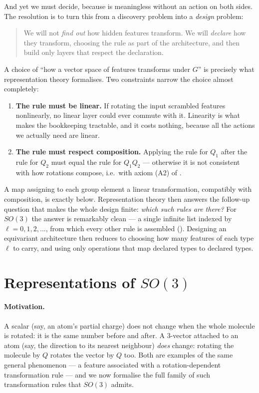 \documentclass[11pt,a4paper]{report}
\theoremstyle{definition}
\theoremstyle{remark}
\begin{document}
And yet we must decide, because  is
meaningless without an action on both sides. The resolution is to turn this
from a discovery problem into a \emph{design} problem:

\begin{quote}
We will not \emph{find out} how hidden features transform. We will
\emph{declare} how they transform, choosing the rule as part of the
architecture, and then build only layers that respect the declaration.
\end{quote}

A choice of ``how a vector space of features transforms under $G$'' is
precisely what representation theory formalises. Two constraints narrow the
choice almost completely:

\begin{enumerate}
\item \textbf{The rule must be linear.} If rotating the input scrambled
features nonlinearly, no linear layer could ever commute with it. Linearity
is what makes the bookkeeping tractable, and it costs nothing, because all
the actions we actually need are linear.
\item \textbf{The rule must respect composition.} Applying the rule for
$Q_1$ after the rule for $Q_2$ must equal the rule for $Q_1Q_2$ --- otherwise
it is not consistent with how rotations compose, i.e.\ with axiom (A2) of
.
\end{enumerate}

A map assigning to each group element a linear transformation, compatibly
with composition, is exactly  below.
Representation theory then answers the follow-up question that makes the
whole design finite: \emph{which such rules are there?} For $SO(3)$ the
answer is remarkably clean --- a single infinite list indexed by
$\ell=0,1,2,\dots$, from which every other rule is assembled
(). Designing an equivariant
architecture then reduces to choosing how many features of each type
$\ell$ to carry, and using only operations that map declared types to
declared types.

\section{Representations of $SO(3)$}
\label{sec:representations}

\paragraph{Motivation.} A scalar (say, an atom's partial charge) does not
change when the whole molecule is rotated: it is the same number before and
after. A $3$-vector attached to an atom (say, the direction to its nearest
neighbour) \emph{does} change: rotating the molecule by $Q$ rotates the
vector by $Q$ too. Both are examples of the same general phenomenon --- a
feature associated with a rotation-dependent transformation rule --- and we
now formalise the full family of such transformation rules that $SO(3)$
admits.
\end{document}
